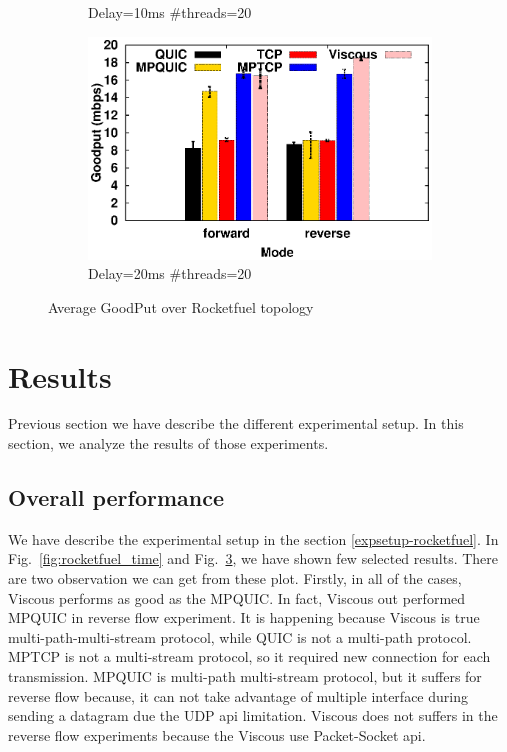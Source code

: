 \begin{figure}[h]
\begin{center}
\begin{subfigure}{.49\linewidth}
		 \caption{\label{fig:rocketfuel_goodput_10_20}Delay=10ms \#threads=20}
		\end{subfigure}
		\begin{subfigure}{.49\linewidth}
			\includegraphics[width=0.95\linewidth]{img/rocketfuel/goodPut-20-20.eps}
		 \caption{\label{fig:rocketfuel_goodput_20_20}Delay=20ms \#threads=20}
		\end{subfigure}
		\caption{\label{fig:rocketfuel_goodput}Average GoodPut over Rocketfuel topology}
	\end{center}
\end{figure}
\section{Results}
Previous section we have describe the different experimental setup. In this section, we analyze the results of those experiments.

\subsection{Overall performance}
We have describe the experimental setup in the section \ref{expsetup-rocketfuel}.
In Fig.~\ref{fig:rocketfuel_time} and Fig.~\ref{fig:rocketfuel_goodput}, we have shown few selected results. There are two observation we can get from these plot. Firstly, in all of the cases, Viscous performs as good as the MPQUIC. In fact, Viscous out performed MPQUIC in reverse flow experiment. It is happening because Viscous is true multi-path-multi-stream protocol, while QUIC is not a multi-path protocol. MPTCP is not a multi-stream protocol, so it required new connection for each transmission. MPQUIC is multi-path multi-stream protocol, but it suffers for reverse flow because, it can not take advantage of multiple interface during sending a datagram due the UDP api limitation. Viscous does not suffers in the reverse flow experiments because the Viscous use Packet-Socket api.



